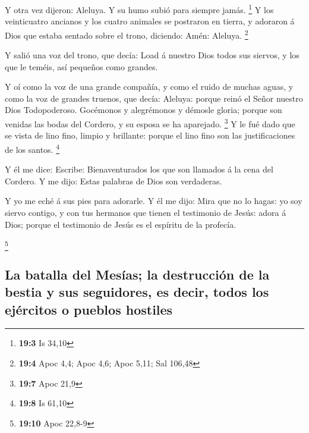  Y otra vez dijeron: Aleluya. Y su humo subió para siempre
jamás. \footnote{\textbf{19:3} Is 34,10}  Y los
veinticuatro ancianos y los cuatro animales se postraron en tierra, y
adoraron á Dios que estaba sentado sobre el trono, diciendo: Amén:
Aleluya. \footnote{\textbf{19:4} Apoc 4,4; Apoc 4,6; Apoc 5,11; Sal
  106,48}

 Y salió una voz del trono, que decía: Load á nuestro Dios
todos sus siervos, y los que le teméis, así pequeños como grandes.

 Y oí como la voz de una grande compañía, y como el ruido
de muchas aguas, y como la voz de grandes truenos, que decía: Aleluya:
porque reinó el Señor nuestro Dios Todopoderoso. 
Gocémonos y alegrémonos y démosle gloria; porque son venidas las bodas
del Cordero, y su esposa se ha aparejado. \footnote{\textbf{19:7} Apoc
  21,9}  Y le fué dado que se vista de lino fino, limpio y
brillante: porque el lino fino son las justificaciones de los santos.
\footnote{\textbf{19:8} Is 61,10}

 Y él me dice: Escribe: Bienaventurados los que son
llamados á la cena del Cordero. Y me dijo: Estas palabras de Dios son
verdaderas.

 Y yo me eché á sus pies para adorarle. Y él me dijo:
Mira que no lo hagas: yo soy siervo contigo, y con tus hermanos que
tienen el testimonio de Jesús: adora á Dios; porque el testimonio de
Jesús es el espíritu de la profecía.

\footnote{\textbf{19:10} Apoc 22,8-9}

\hypertarget{la-batalla-del-mesuxedas-la-destrucciuxf3n-de-la-bestia-y-sus-seguidores-es-decir-todos-los-ejuxe9rcitos-o-pueblos-hostiles}{%
\subsection{La batalla del Mesías; la destrucción de la bestia y sus
seguidores, es decir, todos los ejércitos o pueblos
hostiles}\label{la-batalla-del-mesuxedas-la-destrucciuxf3n-de-la-bestia-y-sus-seguidores-es-decir-todos-los-ejuxe9rcitos-o-pueblos-hostiles}}

